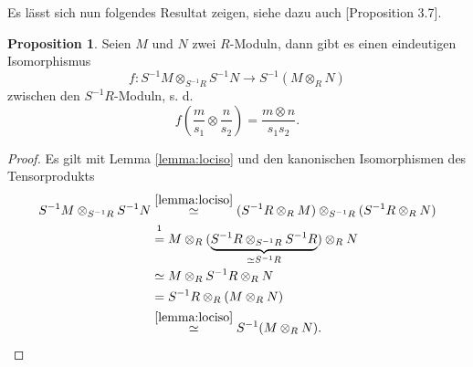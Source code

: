 \documentclass[11pt,titlepage]{article}
\theoremstyle{definition}
\newtheorem{proposition}[theorem]{Proposition}
\theoremstyle{remark}
\begin{document}
	Es lässt sich nun folgendes Resultat zeigen, siehe dazu auch \cite{introductiontocomalg}[Proposition 3.7].
	
	\begin{proposition}\label{prop:tensoriso}
		Seien $M$ und $N$ zwei $R$-Moduln, dann gibt es einen eindeutigen 
		Isomorphismus 
		\[f:S^{-1}M\otimes_{S^{-1}R}S^{-1}N\to S^{-1}(M\otimes_R N)\]
		zwischen den $S^{-1}R$-Moduln, s. d.
		\[f\left(\frac{m}{s_1}\otimes\frac{n}{s_2}\right)=\frac{m\otimes n}{s_1s_2}.\]
	\end{proposition}

	\begin{proof}
		Es gilt mit Lemma \ref{lemma:lociso} und den kanonischen Isomorphismen des 
		Tensorprodukts
		\begin{align*}
			S^{-1}M\otimes_{S^{-1}R}S^{-1}N &\overset{\ref{lemma:lociso}}{\simeq}
			(S^{-1}R\otimes_R M)\otimes_{S^{-1}R}(S^{-1}R\otimes_R N) \\
			&\overset{\footnotemark}{=}
			 M\otimes_R (\underbrace{S^{-1}R\otimes_{S^{-1}R} S^{-1}R}_{\simeq S^{-1}R})\otimes_R N \\
			&\simeq M\otimes_R S^{-1}R \otimes_R N \\
			&= S^{-1}R \otimes_R(M\otimes_R N) \\
			&\overset{\ref{lemma:lociso}}{\simeq} S^{-1}(M\otimes_R N).
		\end{align*}
	\end{proof}

	
\end{document}
